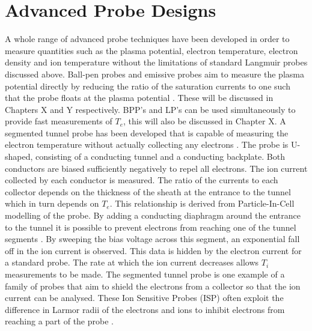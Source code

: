 %
%
%
%



\section{Advanced Probe Designs}
\label{Section:advanced}
A whole range of advanced probe techniques have been developed in order to measure quantities such as the plasma potential, electron temperature, electron density and ion temperature without the limitations of standard Langmuir probes discussed above.  Ball-pen probes and emissive probes aim to measure the plasma potential directly by reducing the ratio of the saturation currents to one such that the probe floats at the plasma potential \cite{advanced}. These will be discussed in Chapters X and Y respectively. BPP's and LP's can be used simultaneously to provide fast measurements of $T_e$, this will also be discussed in Chapter X. 
A segmented tunnel probe has been developed that is capable of measuring the electron temperature without actually collecting any electrons \cite{tunnel}. The probe is U-shaped, consisting of a conducting tunnel and a conducting backplate. Both conductors are biased sufficiently negatively to repel all electrons. The ion current collected by each conductor is measured. The ratio of the currents to each collector depends on the thickness of the sheath at the entrance to the tunnel which in turn depends on $T_e$. This relationship is derived from Particle-In-Cell modelling of the probe. By adding a conducting diaphragm around the entrance to the tunnel it is possible to prevent electrons from reaching one of the tunnel segments \cite{tunnel_ti}. By sweeping the bias voltage across this segment, an exponential fall off in the ion current is observed. This data is hidden by the electron current for a standard probe. The rate at which the ion current decreases allows $T_i$ measurements to be made. The segmented tunnel probe is one example of a family of probes that aim to shield the electrons from a collector so that the ion current can be analysed. These Ion Sensitive Probes (ISP) often exploit the difference in Larmor radii of the electrons and ions to inhibit electrons from reaching a part of the probe \cite{review_isp}. 
